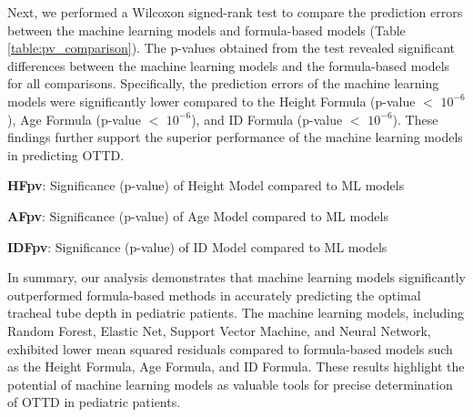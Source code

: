 \documentclass[11pt]{article}
\begin{document}
Next, we performed a Wilcoxon signed-rank test to compare the prediction errors between the machine learning models and formula-based models (Table \ref{table:pv_comparison}). The p-values obtained from the test revealed significant differences between the machine learning models and the formula-based models for all comparisons. Specifically, the prediction errors of the machine learning models were significantly lower compared to the Height Formula (p-value $<$ $10^{-6}$), Age Formula (p-value $<$ $10^{-6}$), and ID Formula (p-value $<$ $10^{-6}$). These findings further support the superior performance of the machine learning models in predicting OTTD.

\begin{table}[h]
\caption{Significance (p-value) in Prediction Errors between Machine Learning Models and Formula-based Models}
\label{table:pv_comparison}
\begin{threeparttable}
\renewcommand{\TPTminimum}{\linewidth}
\begin{tablenotes}
\footnotesize
\item \textbf{HFpv}: Significance (p-value) of Height Model compared to ML models
\item \textbf{AFpv}: Significance (p-value) of Age Model compared to ML models
\item \textbf{IDFpv}: Significance (p-value) of ID Model compared to ML models
\end{tablenotes}
\end{threeparttable}
\end{table}


In summary, our analysis demonstrates that machine learning models significantly outperformed formula-based methods in accurately predicting the optimal tracheal tube depth in pediatric patients. The machine learning models, including Random Forest, Elastic Net, Support Vector Machine, and Neural Network, exhibited lower mean squared residuals compared to formula-based models such as the Height Formula, Age Formula, and ID Formula. These results highlight the potential of machine learning models as valuable tools for precise determination of OTTD in pediatric patients.
\end{document}
